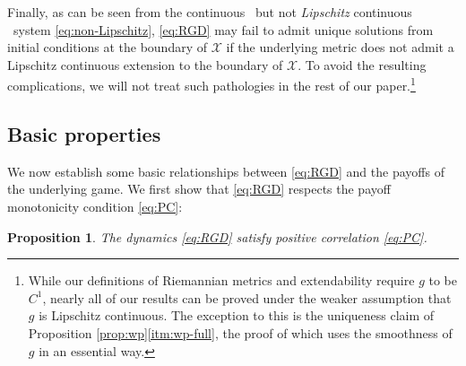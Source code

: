 \documentclass[reqno]{amsart}
\theoremstyle{plain}
\newtheorem{proposition}[theorem]{Proposition}
\theoremstyle{definition}
\theoremstyle{remark}
\numberwithin{equation}{section}
\numberwithin{theorem}{section}
\begin{document}
Finally, as can be seen from the continuous \textendash\ but not \emph{Lipschitz} continuous \textendash\ system \eqref{eq:non-Lipschitz}, \eqref{eq:RGD} may fail to admit unique solutions from initial conditions at the boundary of ${\mathcal{X}}$ if the underlying metric does not admit a Lipschitz continuous extension to the boundary of ${\mathcal{X}}$.
To avoid the resulting complications, we will not treat such pathologies in the rest of our paper.\footnote{While our definitions of Riemannian metrics and extendability require $g$ to be $C^1$, nearly all of our results can be proved under the weaker assumption that $g$ is Lipschitz continuous.
The exception to this is the uniqueness claim of Proposition \ref{prop:wp}\eqref{itm:wp-full}, the proof of which uses the smoothness of $g$ in an essential way.}

\subsection{Basic properties}
\label{sec:basic}

We now establish some basic relationships between \eqref{eq:RGD} and the payoffs of the underlying game.
We first show that \eqref{eq:RGD} respects the payoff monotonicity condition \eqref{eq:PC}:

\begin{proposition}
\label{prop:PC}
The dynamics \eqref{eq:RGD} satisfy positive correlation \eqref{eq:PC}.
\end{proposition}
\end{document}
